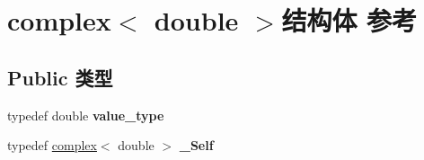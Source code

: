 \hypertarget{structcomplex_3_01double_01_4}{}\section{complex$<$ double $>$结构体 参考}
\label{structcomplex_3_01double_01_4}
\subsection*{Public 类型}
\begin{DoxyCompactItemize}
\item 
\mbox{\label{structcomplex_3_01double_01_4_a1090ad5c64f629fb6948cd7fd5e16617}} 
typedef double {\bfseries value\+\_\+type}
\item 
\mbox{\label{structcomplex_3_01double_01_4_a0465b4c197ca821b81cf1b52ae42b910}} 
typedef \hyperlink{structcomplex}{complex}$<$ double $>$ {\bfseries \+\_\+\+Self}
\end{DoxyCompactItemize}
